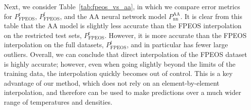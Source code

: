 \documentclass[%
 preprint,
 superscriptaddress,
 amsmath,amssymb,
longbibliography,
]{revtex4-2}
\newcommand{\Paa}{P_\textrm{nn}^\textrm{AA}}
\begin{document}
Next, we consider Table~\ref{tab:fpeos_vs_aa}, in which we compare error metrics for $P_\textrm{FPEOS}^\textrm{r}$, $P_\textrm{FPEOS}^\textrm{f}$, and the AA neural network model $\Paa$. It is clear from this table that the AA model is slightly less accurate than the FPEOS interpolation on the restricted test sets, $P_\textrm{FPEOS}^\textrm{r}$. However, it is more accurate than the FPEOS interpolation on the full datasets, $P_\textrm{FPEOS}^\textrm{f}$, and in particular has fewer large outliers. Overall, we can conclude that direct interpolation of the FPEOS dataset is highly accurate; however, even when going slightly beyond the limits of the training data, the interpolation quickly becomes out of control. This is a key advantage of our method, which does not rely on an element-by-element interpolation, and therefore can be used to make predictions over a much wider range of temperatures and densities.



\end{document}
